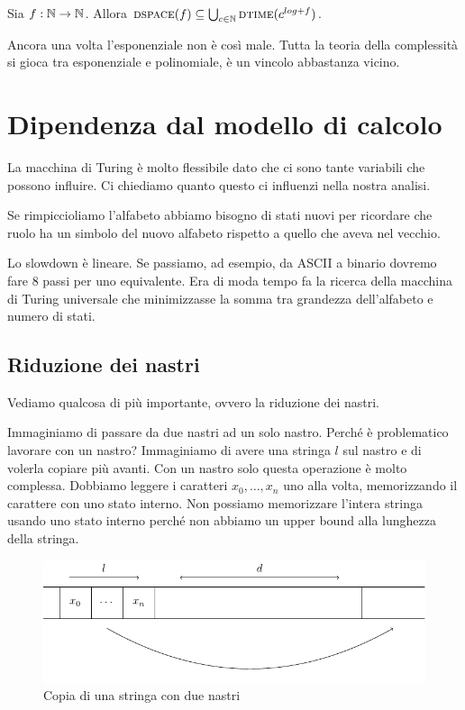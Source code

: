 \begin{thm}
    Sia $f: \mathbb{N} \to \mathbb{N}$. Allora $\textsc{dspace}(f) \subseteq \bigcup_{c \in \mathbb{N}}\textsc{dtime}(c^{log + f})$.
\end{thm}

Ancora una volta l'esponenziale non è così male. Tutta la teoria della complessità si gioca tra
esponenziale e polinomiale, è un vincolo abbastanza vicino.

\section{Dipendenza dal modello di calcolo}

La macchina di Turing è molto flessibile dato che ci sono tante variabili che possono influire. Ci
chiediamo quanto questo ci influenzi nella nostra analisi.

Se rimpiccioliamo l'alfabeto abbiamo bisogno di stati nuovi per ricordare che ruolo ha un simbolo del
nuovo alfabeto rispetto a quello che aveva nel vecchio.

Lo slowdown è lineare. Se passiamo, ad esempio, da ASCII a binario dovremo fare 8 passi per uno
equivalente. Era di moda tempo fa la ricerca della macchina di Turing universale che minimizzasse la
somma tra grandezza dell'alfabeto e numero di stati.


\subsection{Riduzione dei nastri}

Vediamo qualcosa di più importante, ovvero la riduzione dei nastri.

Immaginiamo di passare da due nastri ad un solo nastro. Perché è problematico lavorare con un
nastro? Immaginiamo di avere una stringa $l$ sul nastro e di volerla copiare più avanti. Con un
nastro solo questa operazione è molto complessa. Dobbiamo leggere i caratteri $x_{0},\dotsc,x_{n}$
uno alla volta, memorizzando il carattere con uno stato interno. Non possiamo memorizzare l'intera
stringa usando uno stato interno perché non abbiamo un upper bound alla lunghezza della stringa.

\begin{figure}[h]
    \begin{center}
        \includegraphics{./img/deterministic_complexity_classes/CopyString.pdf}
        \caption{Copia di una stringa con due nastri}
    \end{center}
\end{figure}

